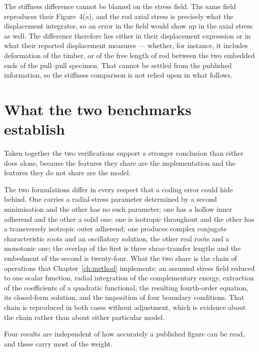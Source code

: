 The stiffness difference cannot be blamed on the stress field. The same field
reproduces their Figure~4(a), and the rod axial stress is precisely what the
displacement integrates, so an error in the field would show up in the axial
stress as well. The difference therefore lies either in their displacement
expression or in what their reported displacement measures --- whether, for
instance, it includes deformation of the timber, or of the free length of rod
between the two embedded ends of the pull--pull specimen. That cannot be
settled from the published information, so the stiffness comparison is not
relied upon in what follows.
 
\section{What the two benchmarks establish}
\label{sec:valsynthesis}
 
Taken together the two verifications support a stronger conclusion than
either does alone, because the features they share are the implementation and
the features they do not share are the model.
 
The two formulations differ in every respect that a coding error could hide
behind. One carries a radial-stress parameter determined by a second
minimisation and the other has no such parameter; one has a hollow inner
adherend and the other a solid one; one is isotropic throughout and the other
has a transversely isotropic outer adherend; one produces complex conjugate
characteristic roots and an oscillatory solution, the other real roots and a
monotonic one; the overlap of the first is three shear-transfer lengths and
the embedment of the second is twenty-four. What the two share is the chain of
operations that Chapter~\ref{ch:method} implements: an assumed stress field
reduced to one scalar function, radial integration of the complementary
energy, extraction of the coefficients of a quadratic functional, the
resulting fourth-order equation, its closed-form solution, and the imposition
of four boundary conditions. That chain is reproduced in both cases without
adjustment, which is evidence about the chain rather than about either
particular model.
 
Four results are independent of how accurately a published figure can be read,
and these carry most of the weight.
 
